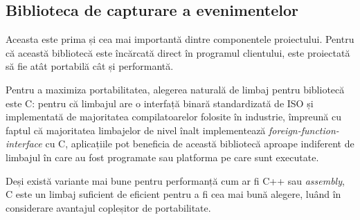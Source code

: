 \subsection{Biblioteca de capturare a evenimentelor}
Aceasta este prima și cea mai importantă dintre componentele
proiectului. Pentru că această bibliotecă este încărcată direct în
programul clientului, este proiectată să fie atât portabilă cât și
performantă.

Pentru a maximiza portabilitatea, alegerea naturală de limbaj
pentru bibliotecă este C\cite{C}: pentru că limbajul are o interfață
binară standardizată de ISO și implementată de majoritatea
compilatoarelor folosite în industrie, împreună cu faptul că majoritatea
limbajelor de nivel înalt implementează
\textit{foreign-function-interface} cu C, aplicațiile pot beneficia de
această bibliotecă aproape indiferent de limbajul în care au fost
programate sau platforma pe care sunt executate.

Deși există variante mai bune pentru performanță cum ar fi C++ sau
\textit{assembly}, C este un limbaj suficient de eficient pentru a fi
cea mai bună alegere, luând în considerare avantajul copleșitor de
portabilitate.

